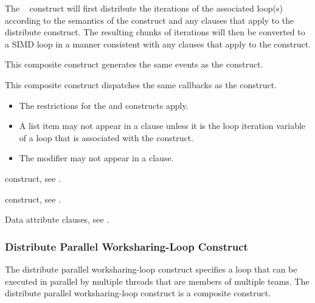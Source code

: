 \descr
The ~ construct will first distribute the iterations 
of the associated loop(s) according to the semantics of the  
construct and any clauses that apply to the distribute construct. The resulting 
chunks of iterations will then be converted to a SIMD loop in a manner consistent 
with any clauses that apply to the  construct.

\events

This composite construct generates the same events as the  construct.

\tools

This composite construct dispatches the same callbacks as the  
construct.

\restrictions
\begin{itemize}
\item The restrictions for the  and  constructs apply.
\item A list item may not appear in a  clause unless it is the
      loop iteration variable of a loop that is associated with the construct.
\item The  modifier may not appear in a  clause.
\end{itemize}

\begin{crossrefs}
\item {} construct, see
.

\item {} construct, see
.

\item Data attribute clauses, see
.
\end{crossrefs}



\subsubsection{Distribute Parallel Worksharing-Loop Construct}
\label{subsec:Distribute Parallel Worksharing-Loop Construct}
\summary
The distribute parallel worksharing-loop construct specifies a loop that can 
be executed in parallel by multiple threads that are members of multiple teams. 
The distribute parallel worksharing-loop construct is a composite construct.

